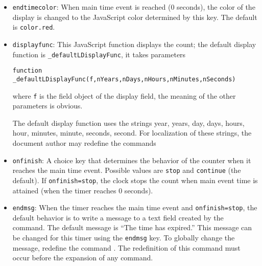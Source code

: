 \documentclass{article}
\begin{document}
\begin{itemize}
    An event handler should take three parameters \texttt{doc},
    \texttt{cTimer}, and \texttt{nEvent}. Use the \texttt{insDLJS} environment
    to define your custom handler. A very simple example is
\begin{verbatim}
\begin{insDLJS}[myEventHandler]{dps}{My Event Handlers}
function myEventHandler (doc,cTimer,nEvent) {
    console.show();
    console.println("Event number " + nEvent + " just occurred);
}
\end{insDLJS}
\end{verbatim}
and type \texttt{eventhandler=myEventHandle} as part of the
key-values of .
    \item \texttt{endtimecolor}: When main time event is reached (0
    seconds), the color of the display is changed to the JavaScript color
    determined by this key. The default is \texttt{color.red}.
    \item \texttt{displayfunc}: This JavaScript function displays the
    count; the default display function is \texttt{\_defaultLDisplayFunc},
    it takes parameters\vspace{3pt}
\begin{Verbatim}[fontsize=\small]
function _defaultLDisplayFunc(f,nYears,nDays,nHours,nMinutes,nSeconds)
\end{Verbatim}
where \texttt{f} is the field object of the display field, the meaning of
the other parameters is obvious.

The default display function uses the strings year, years, day, days,
hours, hour, minutes, minute, seconds, second. For localization of these
strings, the document author may redefine the commands
\begin{dCmd*}{.6\linewidth}
\newcommand{\cntdwnYear}{year}
\newcommand{\cntdwnYears}{years}
\newcommand{\cntdwnDay}{day}
\newcommand{\cntdwnDays}{day}
\newcommand{\cntdwnHour}{hour}
\newcommand{\cntdwnHours}{hours}
\newcommand{\cntdwnMinute}{minute}
\newcommand{\cntdwnMinutes}{minutes}
\newcommand{\cntdwnSecond}{second}
\newcommand{\cntdwnSeconds}{seconds}
\end{dCmd*}
    \item \texttt{onfinish}: A choice key that determines the behavior
        of the counter when it reaches the main time event. Possible
        values are \texttt{stop} and \texttt{continue} (the default).
        If \texttt{onfinish=stop}, the clock stops the count
        when main event time is attained (when the timer reaches 0
        seconds).
    \item \texttt{endmsg}: When the timer reaches the main time event
        and \texttt{onfinish=stop}, the default behavior
        is to write a message to a text field created by the
         command. The default message is ``The time
        has expired.'' This message can be changed for this timer using
        the \texttt{endmsg} key. To globally change the message,
        redefine the command . The
        redefinition of this command must occur before the expansion
        of any  command.
\end{itemize}
\end{document}
